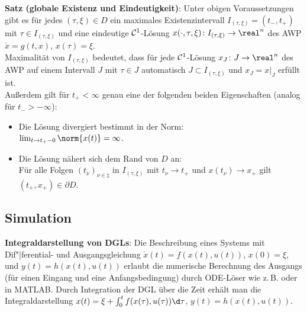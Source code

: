 \textbf{Satz (globale Existenz und Eindeutigkeit)}:
Unter obigen Voraussetzungen gibt es für jedes $(\tau, \xi) \in D$ ein
maximales Existenzintervall $I_{(\tau, \xi)} = (t_-, t_+)$ mit $\tau \in I_{(\tau, \xi)}$
und eine eindeutige $\mathcal{C}^1$-Lösung
$x(\cdot, \tau, \xi)\colon I_{(\tau, \xi)} \rightarrow \real^n$
des AWP $\dot{x} = g(t, x)$, $x(\tau) = \xi$.\\
Maximalität von $I_{(\tau, \xi)}$ bedeutet, dass für jede $\mathcal{C}^1$-Lösung
$x_J\colon J \rightarrow \real^n$ des AWP auf einem Intervall $J$ mit $\tau \in J$
automatisch $J \subset I_{(\tau, \xi)}$ und $x_J = x|_J$ erfüllt ist.\\
Außerdem gilt für $t_+ < \infty$ genau eine der folgenden beiden Eigenschaften
(analog für $t_- > -\infty$):
\begin{itemize}
    \item
    Die Lösung divergiert bestimmt in der Norm:\\
    $\lim_{t \to t_+-0} \norm{x(t)} = \infty$.

    \item
    Die Lösung nähert sich dem Rand von $D$ an:\\
    Für alle Folgen $(t_\nu)_{\nu \in \natural}$ in $I_{(\tau, \xi)}$ mit
    $t_\nu \to t_+$ und $x(t_\nu) \to x_+$
    gilt $(t_+, x_+) \in \partial D$.
\end{itemize}

\pagebreak

\subsection{%
    Simulation%
}

\textbf{Integraldarstellung von DGLs}:
Die Beschreibung eines Systems mit Dif"|ferential- und Ausgangsgleichung
$\dot{x}(t) = f(x(t), u(t))$, $x(0) = \xi$, und $y(t) = h(x(t), u(t))$
erlaubt die numerische Berechnung des Ausgangs (für einen Eingang und eine Anfangsbedingung)
durch ODE-Löser wie z.\,B.  oder  in MATLAB.
Durch Integration der DGL über die Zeit erhält man die Integraldarstellung
$x(t) = \xi + \int_0^t f(x(\tau), u(\tau))\d\tau$, $y(t) = h(x(t), u(t))$.

